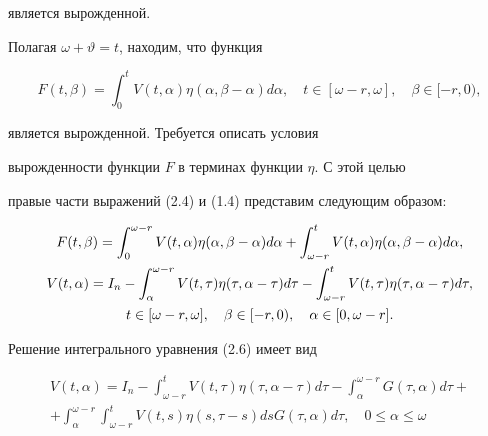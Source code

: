 \begin{pf}
является вырожденной.


Полагая $\omega+ \vartheta=t$, находим, что функция


\begin{equation}


F(t,\beta)


= \int_{0}^{t} V(t, \alpha) \eta(\alpha, \beta- \alpha) d \alpha,


\quad t \in [\omega -r, \omega],  \quad \beta \in [-r,0),


\end{equation}


является вырожденной. Требуется описать условия


вырожденности функции $F$ в терминах функции $\eta$. С этой целью


правые части выражений (2.4) и (1.4) представим следующим образом:


\begin{gather}


F(t, \beta) = \int_{0}^{\omega-r}V(t, \alpha)


\eta(\alpha, \beta- \alpha) d \alpha+ \int_{\omega-r}^{t}V(t, \alpha)


\eta(\alpha, \beta- \alpha) d \alpha, \\


%


V(t,\alpha) =I_{n} - \int_{\alpha}^{\omega-r}V( t, \tau) \eta(\tau,


\alpha- \tau) d \tau- \int_{\omega -r}^{t}V(t, \tau) \eta(\tau,


\alpha- \tau) d \tau, \\


t \in[\omega-r,


\omega], \quad \beta \in[-r,0), \quad \alpha \in [0,\omega - r].\notag


\end{gather}


Решение интегрального уравнения (2.6) имеет вид


\begin{multline}


V(t, \alpha)


=I_{n} - \int_{\omega-r}^{t}V( t, \tau) \eta(\tau, \alpha- \tau) d


\tau- \int_{\alpha }^{\omega-r}G(\tau, \alpha) d \tau+ \\ +


\int_{\alpha}^{\omega-r} \int_{\omega-r}^{t}V( t,s) \eta(s,


\tau-s) ds G(\tau, \alpha) d \tau, \quad 0 \leq \alpha \leq \omega



\end{multline}
\end{pf}
